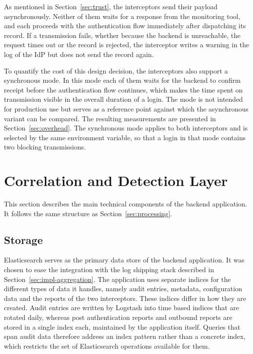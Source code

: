 \documentclass[../main.tex]{subfiles}
\begin{document}
As mentioned in Section~\ref{sec:trust}, the interceptors send their payload asynchronously. 
Neither of them waits for a response from the monitoring tool, and each proceeds with the 
authentication flow immediately after dispatching its record. 
If a transmission fails, whether because the backend is unreachable, the request times out or 
the record is rejected, the interceptor writes a warning in the log of the IdP but does not send 
the record again. 

To quantify the cost of this design decision, the interceptors also support a synchronous mode. 
In this mode each of them waits for the backend to confirm receipt before the authentication flow 
continues, which makes the time spent on transmission visible in the overall duration of a login. 
The mode is not intended for production use but serves as a reference point against which 
the asynchronous variant can be compared. 
The resulting measurements are presented in Section~\ref{sec:overhead}.
The synchronous mode applies to both interceptors and is selected by the same environment 
variable, so that a login in that mode contains two blocking transmissions. 

\section{Correlation and Detection Layer}\label{sec:impl-processing}

This section describes the main technical components of the backend application. 
It follows the same structure as Section~\ref{sec:processing}. 

\subsection{Storage}\label{subsec:impl-storage}

Elasticsearch serves as the primary data store of the backend application. 
It was chosen to ease the integration with the log shipping stack described in 
Section~\ref{sec:impl-aggregation}. 
The application uses separate indices for the different types of data it handles, 
namely audit entries, metadata, configuration data and the reports of the two 
interceptors. 
These indices differ in how they are created. 
Audit entries are written by Logstash into time based indices that are rotated daily, 
whereas post authentication reports and outbound reports are stored in a single index each, 
maintained by the application itself. 
Queries that span audit data therefore address an index pattern rather than a concrete 
index, which restricts the set of Elasticsearch operations available for them.
\end{document}
